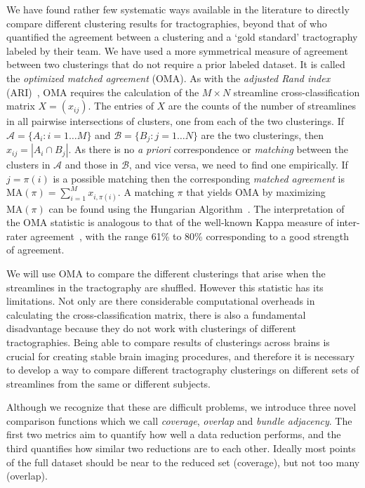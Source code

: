 \documentclass{bioinfo}
\begin{document}
\begin{methods}
We have found rather few systematic ways available in the literature to
directly compare different clustering results for tractographies, beyond
that of \citet{moberts2005evaluation} who quantified the agreement
between a clustering and a `gold standard' tractography labeled by
their team.  We have used a more symmetrical measure of agreement
between two clusterings that do not require a prior labeled dataset.
It is called the \emph{optimized matched agreement} (OMA). As with the
\emph{adjusted Rand index} (ARI)~\citep{moberts2005evaluation}, OMA
requires the calculation of the $M \times N$ streamline
cross-classification matrix $X=(x_{ij})$. The entries of $X$ are the
counts of the number of streamlines in all pairwise intersections of
clusters, one from each of the two clusterings.  If
$\mathcal{A}=\{A_i:i=1\dots M\}$ and $\mathcal{B}=\{B_j:j=1\ldots N\}$
are the two clusterings, then $x_{ij}=|A_i \cap B_j|$. As there is no
\emph{a priori} correspondence or \emph{matching} between the clusters
in $\mathcal{A}$ and those in $\mathcal{B}$, and vice versa, we need to
find one empirically. If $j=\pi(i)$ is a possible matching then the
corresponding \emph{matched agreement} is $\mathrm{MA}(\pi) =
\sum_{i=1}^M x_{i,\pi(i)}$. A matching $\pi$ that yields OMA by
maximizing $\mathrm{MA}(\pi)$ can be found using the Hungarian
Algorithm~\citep{Kuhn1955}. The interpretation of the OMA statistic is
analogous to that of the well-known Kappa measure of inter-rater
agreement~\citep{altman1995}, with the range 61\% to 80\% corresponding
to a good strength of agreement.

We will use OMA to compare the different clusterings that arise when the
streamlines in the tractography are shuffled. However this statistic has
its limitations. Not only are there considerable computational overheads
in calculating the cross-classification matrix, there is also a
fundamental disadvantage because they do not work with clusterings of
different tractographies. Being able to compare results of clusterings
across brains is crucial for creating stable brain imaging procedures,
and therefore it is necessary to develop a way to compare different
tractography clusterings on different sets of streamlines from the same
or different subjects.

Although we recognize that these are difficult problems, we introduce
three novel comparison functions which we call \emph{coverage},
\emph{overlap} and \emph{bundle adjacency}. The first two metrics aim to
quantify how well a data reduction performs, and the third quantifies
how similar two reductions are to each other. Ideally most points of the
full dataset should be near to the reduced set (coverage), but not too
many (overlap).


\end{methods}
\end{document}
